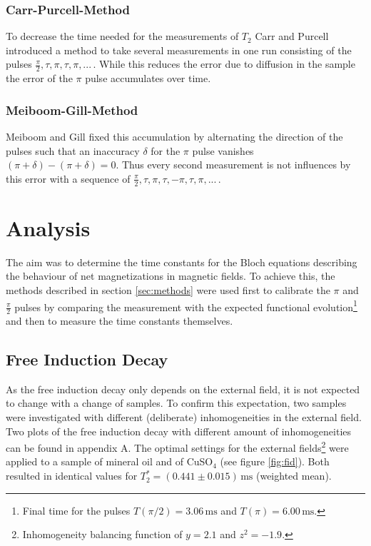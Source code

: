 \documentclass[a4paper]{scrartcl}
\numberwithin{equation}{section}
\numberwithin{figure}{section}
\numberwithin{table}{section}
\begin{document}
\subsubsection*{Carr-Purcell-Method}
To decrease the time needed for the measurements of $T_2$ Carr and Purcell introduced a method to take several measurements in one run consisting of the pulses $\frac{\pi}{2},\tau,\pi,\tau,\pi,...\,$. While this reduces the error due to diffusion in the sample the error of the $\pi$ pulse accumulates over time.

\subsubsection*{Meiboom-Gill-Method}
Meiboom and Gill fixed this accumulation by alternating the direction of the pulses such that an inaccuracy $\delta$ for the $\pi$ pulse vanishes $(\pi+\delta)-(\pi+\delta)=0$. Thus every second measurement is not influences by this error with a sequence of $\frac{\pi}{2},\tau,\pi,\tau,-\pi,\tau,\pi,...\,$.


\clearpage
\section{Analysis}
The aim was to determine the time constants for the Bloch equations describing the behaviour of net magnetizations in magnetic fields. To achieve this, the methods described in section \ref{sec:methods} were used first to calibrate the $\pi$ and $\frac{\pi}{2}$ pulses by comparing the measurement with the expected functional evolution\footnote{Final time for the pulses $T\left(\pi/2\right) = 3.06\,\text{ms}$ and $T\left(\pi\right) = 6.00\,\text{ms}$.} and then to measure the time constants themselves.

\subsection{Free Induction Decay}
As the free induction decay only depends on the external field, it is not expected to change with a change of samples. To confirm this expectation, two samples were investigated with different (deliberate) inhomogeneities in the external field. Two plots of the free induction decay with different amount of inhomogeneities can be found in appendix A. The optimal settings for the external fields\footnote{Inhomogeneity balancing function of $y=2.1$ and $z^2 = -1.9$.} were applied to a sample of mineral oil and of CuSO$_4$ (see figure \ref{fig:fid}). Both resulted in identical values for $T_2^* = (0.441\pm 0.015)\,\text{ms}$ (weighted mean).
\end{document}
